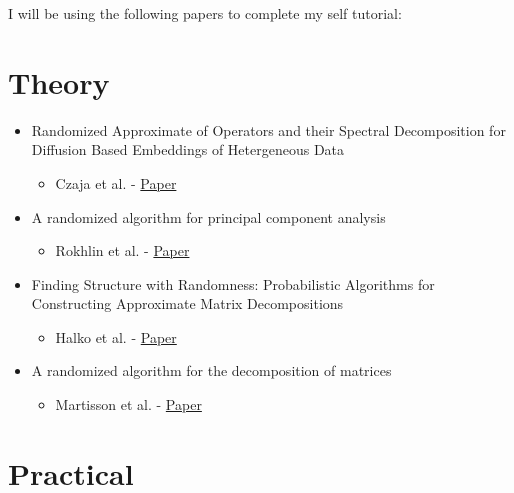 \documentclass[11pt]{article}
\providecommand{\tightlist}{%
      \setlength{\itemsep}{0pt}\setlength{\parskip}{0pt}}
\begin{document}
    I will be using the following papers to complete my self tutorial:

\hypertarget{theory}{%
\section{Theory}\label{theory}}

\begin{itemize}
\tightlist
\item
  Randomized Approximate of Operators and their Spectral Decomposition
  for Diffusion Based Embeddings of Hetergeneous Data

  \begin{itemize}
  \tightlist
  \item
    Czaja et al. -
    \href{http://ieeexplore.ieee.org/xpls/abs_all.jsp?arnumber=7330267\&tag=1}{Paper}
  \end{itemize}
\item
  A randomized algorithm for principal component analysis

  \begin{itemize}
  \tightlist
  \item
    Rokhlin et al. - \href{http://arxiv.org/pdf/0809.2274.pdf}{Paper}
  \end{itemize}
\item
  Finding Structure with Randomness: Probabilistic Algorithms for
  Constructing Approximate Matrix Decompositions

  \begin{itemize}
  \tightlist
  \item
    Halko et al. - \href{https://arxiv.org/pdf/0909.4061}{Paper}
  \end{itemize}
\item
  A randomized algorithm for the decomposition of matrices

  \begin{itemize}
  \tightlist
  \item
    Martisson et al. -
    \href{https://math.berkeley.edu/~strain/273.F10/martinsson.tygert.rokhlin.randomized.decomposition.pdf}{Paper}
  \end{itemize}
\end{itemize}

\hypertarget{practical}{%
\section{Practical}\label{practical}}
\end{document}
